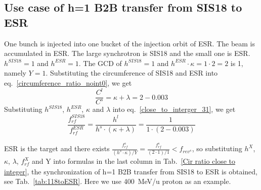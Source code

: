 \subsection{Use case of h=1 B2B transfer from SIS18 to ESR} 
One bunch is injected into one bucket of the injection orbit of ESR. The beam is accumulated in ESR. The large synchrotron is SIS18 and the small one is ESR. $h^{\mathit{SIS18}}=1$ and $h^{\mathit{ESR}}=1$. The GCD of $h^{\mathit{SIS18}}=1$ and $h^{\mathit{ESR}}\cdot \kappa=1\cdot 2=2$ is 1, namely $Y=1$. Substituting the circumference of SIS18 and ESR into eq.~\ref{circumference_ratio_noint0}, we get
\begin{equation}
\frac{C^l}{C^s}=\kappa + \lambda =2-0.003
\end{equation}
Substituting $h^{\mathit{SIS18}}$, $h^{\mathit{ESR}}$, $\kappa$ and $\lambda$ into eq.~\ref{close_to_interger_31}, we get
\begin{equation}
\frac {f_{\mathit{rf}}^{\mathit{SIS18}}}{f_{\mathit{rf}}^{\mathit{ESR}}}= \frac{h^l}{h^s \cdot (\kappa+ \lambda)}=\frac {1}{1 \cdot(2-0.003)}
\end{equation}

ESR is the target and there exists $\frac{f_{\mathit{rf}}^{s}}{(h^s \cdot\kappa)/Y}=\frac{f_{\mathit{rf}}^{s}}{(2 \cdot 1)/1}<f_{\mathit{rev}^s}$, so substituting $h^X$, $\kappa$, $\lambda$, $f_{\mathit{rf}}^{X}$ and Y into formulas in the last column in Tab.~\ref{Cir ratio close to integer}, the synchronization of h=1 B2B transfer from SIS18 to ESR is obtained, see Tab.~\ref{tab:118toESR}. Here we use \SI{400}{MeV/\atomicmassunit} proton as an example. 

